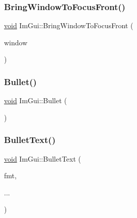 \mbox{\label{namespaceImGui_affe95a2dc969f0d15fbd4b588c94ac1a}} 
\subsubsection{\texorpdfstring{Bring\+Window\+To\+Focus\+Front()}{BringWindowToFocusFront()}}
{\footnotesize\ttfamily \hyperlink{imgui__impl__opengl3__loader_8h_ac668e7cffd9e2e9cfee428b9b2f34fa7}{void} Im\+Gui\+::\+Bring\+Window\+To\+Focus\+Front (\begin{DoxyParamCaption}\item[{\hyperlink{structImGuiWindow}{Im\+Gui\+Window} $\ast$}]{window }\end{DoxyParamCaption})}

\mbox{\label{namespaceImGui_ae2d22212681556d2c2398dfd152f3121}} 
\subsubsection{\texorpdfstring{Bullet()}{Bullet()}}
{\footnotesize\ttfamily \hyperlink{imgui__impl__opengl3__loader_8h_ac668e7cffd9e2e9cfee428b9b2f34fa7}{void} Im\+Gui\+::\+Bullet (\begin{DoxyParamCaption}{ }\end{DoxyParamCaption})}

\mbox{\label{namespaceImGui_af8d34d563b17c683943a0fa7bf5807bc}} 
\subsubsection{\texorpdfstring{Bullet\+Text()}{BulletText()}}
{\footnotesize\ttfamily \hyperlink{imgui__impl__opengl3__loader_8h_ac668e7cffd9e2e9cfee428b9b2f34fa7}{void} Im\+Gui\+::\+Bullet\+Text (\begin{DoxyParamCaption}\item[{const char $\ast$}]{fmt,  }\item[{}]{... }\end{DoxyParamCaption})}

